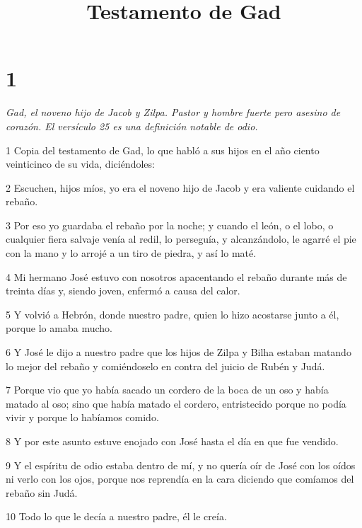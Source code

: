 

\title{Testamento de Gad}

\chapter{1}

\par \textit{Gad, el noveno hijo de Jacob y Zilpa. Pastor y hombre fuerte pero asesino de corazón. El versículo 25 es una definición notable de odio.}

\par 1 Copia del testamento de Gad, lo que habló a sus hijos en el año ciento veinticinco de su vida, diciéndoles:

\par 2 Escuchen, hijos míos, yo era el noveno hijo de Jacob y era valiente cuidando el rebaño.

\par 3 Por eso yo guardaba el rebaño por la noche; y cuando el león, o el lobo, o cualquier fiera salvaje venía al redil, lo perseguía, y alcanzándolo, le agarré el pie con la mano y lo arrojé a un tiro de piedra, y así lo maté.

\par 4 Mi hermano José estuvo con nosotros apacentando el rebaño durante más de treinta días y, siendo joven, enfermó a causa del calor.

\par 5 Y volvió a Hebrón, donde nuestro padre, quien lo hizo acostarse junto a él, porque lo amaba mucho.

\par 6 Y José le dijo a nuestro padre que los hijos de Zilpa y Bilha estaban matando lo mejor del rebaño y comiéndoselo en contra del juicio de Rubén y Judá.

\par 7 Porque vio que yo había sacado un cordero de la boca de un oso y había matado al oso; sino que había matado el cordero, entristecido porque no podía vivir y porque lo habíamos comido.

\par 8 Y por este asunto estuve enojado con José hasta el día en que fue vendido.

\par 9 Y el espíritu de odio estaba dentro de mí, y no quería oír de José con los oídos ni verlo con los ojos, porque nos reprendía en la cara diciendo que comíamos del rebaño sin Judá.

\par 10 Todo lo que le decía a nuestro padre, él le creía.

